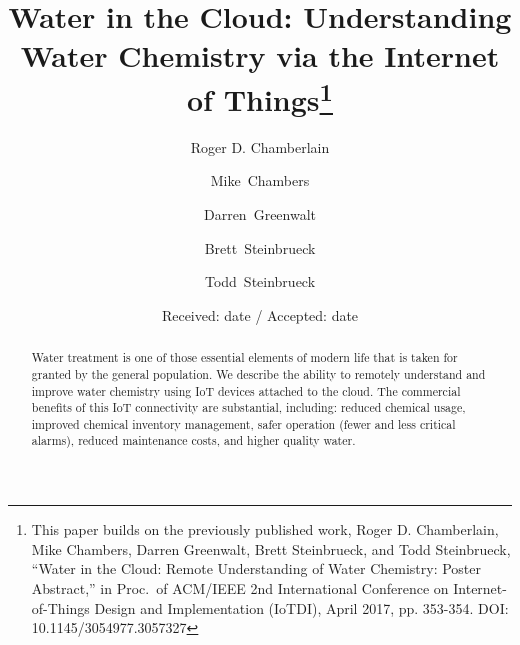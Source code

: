 \documentclass[smallextended]{svjour3}       %
\begin{document}
\title{Water in the Cloud: Understanding Water Chemistry via the
Internet of Things\thanks{This paper builds on the previously published work,
Roger D. Chamberlain, Mike Chambers, Darren Greenwalt, Brett Steinbrueck,
and Todd Steinbrueck, ``Water in the Cloud: Remote Understanding of Water
Chemistry: Poster Abstract,'' in Proc.~of ACM/IEEE 2nd International
Conference on Internet-of-Things Design and Implementation (IoTDI),
April 2017, pp. 353-354. DOI: 10.1145/3054977.3057327}
}


\author{Roger D. Chamberlain
\and
 Mike~Chambers
\and
 Darren~Greenwalt
\and
 Brett~Steinbrueck
\and
 Todd~Steinbrueck
}



\date{Received: date / Accepted: date}


\maketitle

\begin{abstract}
Water treatment is one of those essential elements of modern life
that is taken for granted by the general population.
We describe the ability to remotely understand and
improve water chemistry using IoT devices attached to the cloud.
The commercial benefits of this IoT connectivity are substantial,
including: reduced chemical usage, improved chemical inventory 
management, safer operation (fewer and less critical alarms),
reduced maintenance costs, and higher quality water.

\end{abstract}
\end{document}
